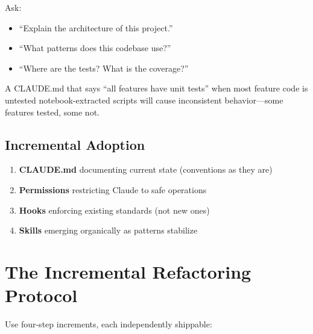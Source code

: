 Ask:
\begin{itemize}
  \item ``Explain the architecture of this project.''
  \item ``What patterns does this codebase use?''
  \item ``Where are the tests? What is the coverage?''
\end{itemize}


A CLAUDE.md that says ``all features have unit tests'' when most feature code
is untested notebook-extracted scripts will cause inconsistent behavior---some
features tested, some not.

\subsection{Incremental Adoption}


\begin{enumerate}
  \item \textbf{CLAUDE.md} documenting current state (conventions as they are)
  \item \textbf{Permissions} restricting Claude to safe operations
  \item \textbf{Hooks} enforcing existing standards (not new ones)
  \item \textbf{Skills} emerging organically as patterns stabilize
\end{enumerate}

\section{The Incremental Refactoring Protocol}
\label{sec:refactoring-protocol}

Use four-step increments, each independently shippable:

